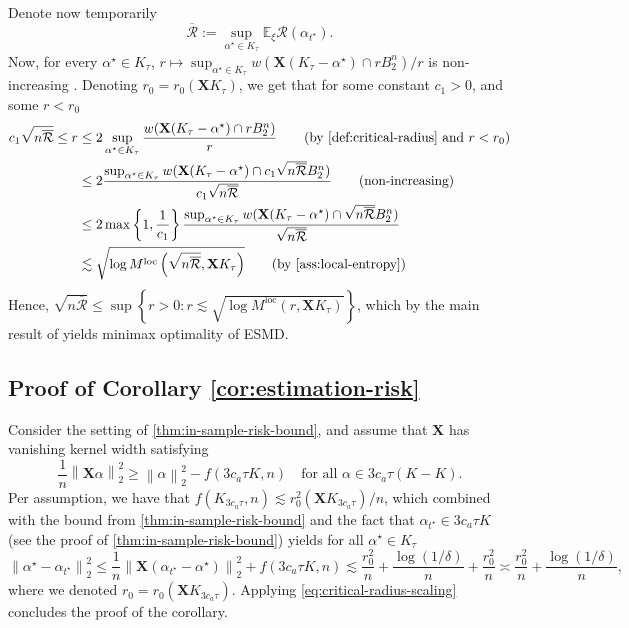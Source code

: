 \documentclass[a4paper]{article}
\newcommand{\mathset}[1]{\left\{#1\right\}}
\newcommand{\pr}[1]{\left(#1\right)}
\newcommand{\norm}[1]{\left\|#1\right\|}
\newcommand{\X}[0]{\mathbf{X}}
\newcommand{\EE}[0]{\mathbb{E}}
\newcommand{\cR}[0]{\mathcal{R}}
\newcommand{\alphastar}{\alpha^\star}
\newcommand{\alphatstar}[0]{\alpha_{t^\star}}
\newcommand{\Kt}[0]{K_\tau}
\DeclareMathOperator{\locOp}{loc}
\newcommand{\rzero}[0]{r_{0}}
\newcommand{\locEntropy}[0]{M^{\locOp}}
\newcommand{\Rbar}[0]{\overline{\cR}}
\theoremstyle{thmstyle}
\theoremstyle{defstyle}
\theoremstyle{remark}
\begin{document}
Denote now temporarily
\begin{equation*}
    \Rbar:= \sup_{\alphastar\in \Kt} \EE_\xi \cR(\alphatstar).
\end{equation*}
Now, for every $\alphastar\in \Kt$, $r\mapsto \sup_{\alphastar\in \Kt} w(\X(\Kt-\alphastar)\cap rB_2^n)/r$ is non-increasing \citep[page 7]{Prasadan2024some}. Denoting $\rzero=\rzero(\X \Kt)$, we get that for some constant $c_1>0$, and some $r<\rzero$
\begin{align*}
    c_1\sqrt{n\Rbar}\leq r &\leq 2 \sup_{\alphastar\in \Kt} \frac{w(\X(\Kt-\alphastar)\cap r B_2^n)}{r} \tag{by \cref{def:critical-radius} and $r<\rzero$} \\
    &\leq 2  \frac{\sup_{\alphastar\in \Kt} w(\X(\Kt-\alphastar)\cap c_1\sqrt{n\Rbar} B_2^n)}{c_1\sqrt{n\Rbar}} \tag{non-increasing} \\
    &\leq 2 \max\mathset{1,\frac{1}{c_1}} \frac{\sup_{\alphastar\in \Kt} w(\X(\Kt-\alphastar)\cap \sqrt{n\Rbar} B_2^n)}{\sqrt{n\Rbar}}\\
    &\lesssim \sqrt{\log \locEntropy\pr{\sqrt{n\Rbar}, \X \Kt}} \tag{by \cref{ass:local-entropy}}
\end{align*}
Hence, $\sqrt{n\Rbar} \leq \sup\mathset{r>0: r\lesssim \sqrt{\log \locEntropy\pr{r, \X \Kt}}}$, which by the main result of \cite{Neykov2022minimax} yields minimax optimality of ESMD.

\subsection{Proof of Corollary \ref{cor:estimation-risk}}
\label{subsec:proof-estimation-risk}

    Consider the setting of \cref{thm:in-sample-risk-bound}, and assume that $\X$ has vanishing kernel width satisfying
    \begin{equation*}
        \frac{1}{n}\norm{\X\alpha}_2^2\geq \norm{\alpha}_2^2-f(3c_a\tau K,n)\quad \text{for all }\alpha\in 3c_a\tau\pr{K-K}.
    \end{equation*}
    Per assumption, we have that $f(K_{3c_a\tau },n)\lesssim \rzero^2(\X K_{3c_a\tau })/n$, which combined with the bound from \cref{thm:in-sample-risk-bound} and the fact that $\alphatstar\in 3c_a\tau K$ (see the proof of \cref{thm:in-sample-risk-bound}) yields for all $\alphastar\in \Kt$
    \begin{equation*}
        \norm{\alphastar-\alphatstar}_2^2\leq \frac{1}{n}\norm{\X(\alphatstar-\alphastar)}_2^2+f(3c_a\tau K,n)\lesssim \frac{\rzero^2}{n}+\frac{\log(1/\delta)}{n} + \frac{\rzero^2}{n}\asymp \frac{\rzero^2}{n}+\frac{\log(1/\delta)}{n},
    \end{equation*}
    where we denoted $\rzero = \rzero(\X K_{3c_a\tau })$.
    Applying \cref{eq:critical-radius-scaling} concludes the proof of the corollary.
\end{document}
